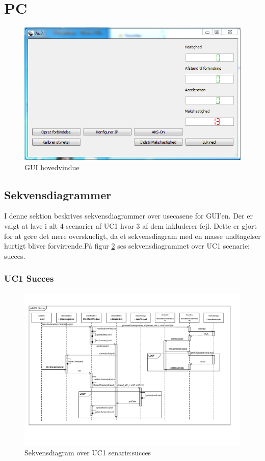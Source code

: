 \section{PC} \label{sec:PC}

\begin{figure}[h!]
\centering
\includegraphics[width=\textwidth* 3/4]{../fig/billeder/gui_start.png}
\caption{GUI hovedvindue}
\label{fig:GUI_hovedvindue}
\end{figure}

\subsection{Sekvensdiagrammer}

I denne sektion beskrives sekvensdiagrammer over usecasene for GUI'en. Der er valgt at lave i alt 4 scenarier af UC1 hvor 3 af dem inkluderer fejl. Dette er gjort for at gøre det mere overskueligt, da et sekvensdiagram med en masse undtagelser hurtigt bliver forvirrende.På figur
\ref{fig:cd_uc1_succes_gui} ses sekvensdiagrammet over UC1 scenarie: succes.

\subsubsection{UC1 Succes}

\begin{figure}[ht]
\centering
\includegraphics[width=\textwidth* 1,]{../fig/diagrammer/pc/sd_uc1_succes.pdf}
\caption{Sekvensdiagram over UC1 senarie:succes}
\label{fig:cd_uc1_succes_gui}
\end{figure}

